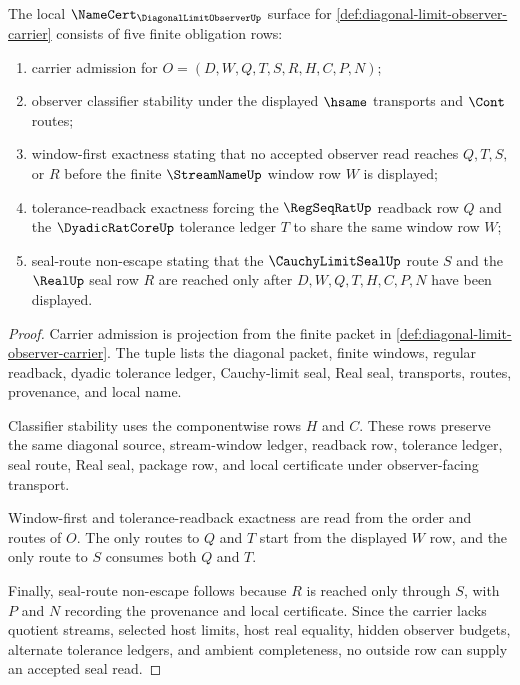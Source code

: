\begin{theorem}
\label{thm:diagonal-limit-observer-namecert-obligations}
The local $\NameCert_{\DiagonalLimitObserverUp}$ surface for \autoref{def:diagonal-limit-observer-carrier} consists of five finite obligation rows:
\begin{enumerate}
\item carrier admission for $O=(D,W,Q,T,S,R,H,C,P,N)$;
\item observer classifier stability under the displayed $\hsame$ transports and $\Cont$ routes;
\item window-first exactness stating that no accepted observer read reaches $Q,T,S,$ or $R$ before the finite $\StreamNameUp$ window row $W$ is displayed;
\item tolerance-readback exactness forcing the $\RegSeqRatUp$ readback row $Q$ and the $\DyadicRatCoreUp$ tolerance ledger $T$ to share the same window row $W$;
\item seal-route non-escape stating that the $\CauchyLimitSealUp$ route $S$ and the $\RealUp$ seal row $R$ are reached only after $D,W,Q,T,H,C,P,N$ have been displayed.
\end{enumerate}
\end{theorem}
\begin{proof}
Carrier admission is projection from the finite packet in \autoref{def:diagonal-limit-observer-carrier}. The tuple lists the diagonal packet, finite windows, regular readback, dyadic tolerance ledger, Cauchy-limit seal, Real seal, transports, routes, provenance, and local name.

Classifier stability uses the componentwise rows $H$ and $C$. These rows preserve the same diagonal source, stream-window ledger, readback row, tolerance ledger, seal route, Real seal, package row, and local certificate under observer-facing transport.

Window-first and tolerance-readback exactness are read from the order and routes of $O$. The only routes to $Q$ and $T$ start from the displayed $W$ row, and the only route to $S$ consumes both $Q$ and $T$.

Finally, seal-route non-escape follows because $R$ is reached only through $S$, with $P$ and $N$ recording the provenance and local certificate. Since the carrier lacks quotient streams, selected host limits, host real equality, hidden observer budgets, alternate tolerance ledgers, and ambient completeness, no outside row can supply an accepted seal read.
\end{proof}

